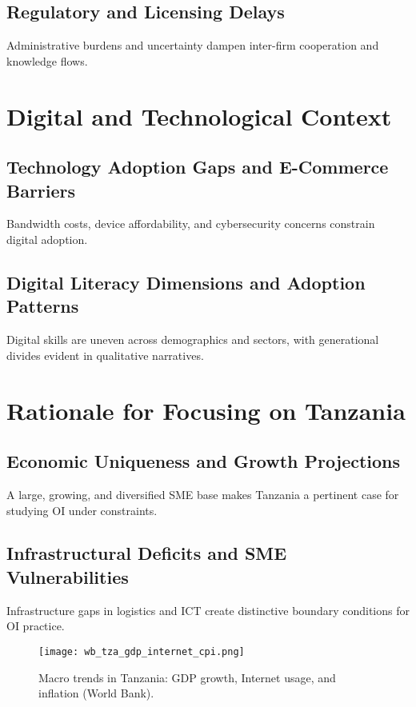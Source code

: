 \subsection{Regulatory and Licensing Delays}
Administrative burdens and uncertainty dampen inter-firm cooperation and knowledge flows.

\section{Digital and Technological Context}
\subsection{Technology Adoption Gaps and E-Commerce Barriers}
Bandwidth costs, device affordability, and cybersecurity concerns constrain digital adoption.

\subsection{Digital Literacy Dimensions and Adoption Patterns}
Digital skills are uneven across demographics and sectors, with generational divides evident in qualitative narratives.

\section{Rationale for Focusing on Tanzania}
\subsection{Economic Uniqueness and Growth Projections}
A large, growing, and diversified SME base makes Tanzania a pertinent case for studying OI under constraints.

\subsection{Infrastructural Deficits and SME Vulnerabilities}
Infrastructure gaps in logistics and ICT create distinctive boundary conditions for OI practice.

\begin{figure}[H]
  \centering
  \texttt{[image: wb\_tza\_gdp\_internet\_cpi.png]}
  \caption{Macro trends in Tanzania: GDP growth, Internet usage, and inflation (World Bank).}
  \label{fig:wb_trends}
\end{figure}
